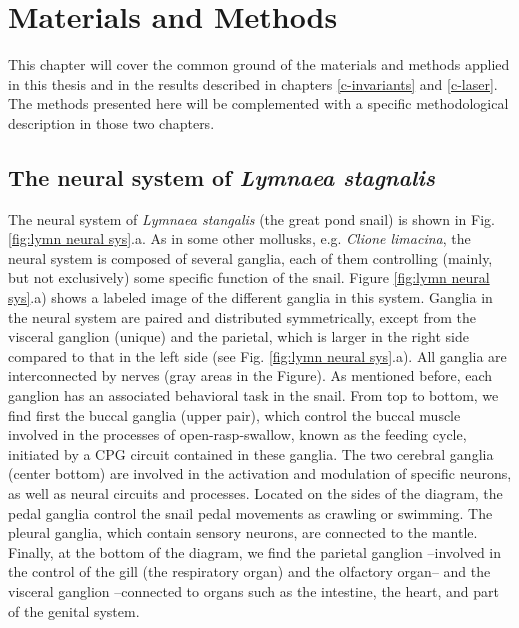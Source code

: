 \chapter{Materials and Methods}
This chapter will cover the common ground of the materials and methods applied in this thesis and in the results described in chapters \ref{c-invariants} and \ref{c-laser}. The methods presented here will be complemented with a specific methodological description in those two chapters.

\section{The neural system of \textit{Lymnaea stagnalis}}
\label{sec:lymnaea morphology}
The neural system of \textit{Lymnaea stangalis} (the great pond snail) is shown in Fig. \ref{fig:lymn neural sys}.a. As in some other mollusks, e.g. {\sl Clione limacina}, the neural system is composed of several ganglia, each of them controlling (mainly, but not exclusively) some specific function of the snail. Figure \ref{fig:lymn neural sys}.a) shows a labeled image of the different ganglia in this system. Ganglia in the neural system are paired and distributed symmetrically, except from the visceral ganglion (unique) and the parietal, which is larger in the right side compared to that in the left side (see Fig. \ref{fig:lymn neural sys}.a). All ganglia are interconnected by nerves (gray areas in the Figure). As mentioned before, each ganglion has an associated behavioral task in the snail. From top to bottom, we find first the buccal ganglia (upper pair), which control the buccal muscle involved in the processes of open-rasp-swallow, known as the feeding cycle, initiated by a CPG circuit contained in these ganglia. The two cerebral ganglia (center bottom) are involved in the activation and modulation of specific neurons, as well as neural circuits and processes. Located on the sides of the diagram, the pedal ganglia control the snail pedal movements as crawling or swimming. The pleural ganglia, which contain sensory neurons, are connected to the mantle. Finally, at the bottom of the diagram, we find the parietal ganglion --involved in the control of the gill (the respiratory organ) and the olfactory organ-- and the visceral ganglion --connected to organs such as the intestine, the heart, and part of the genital system.


